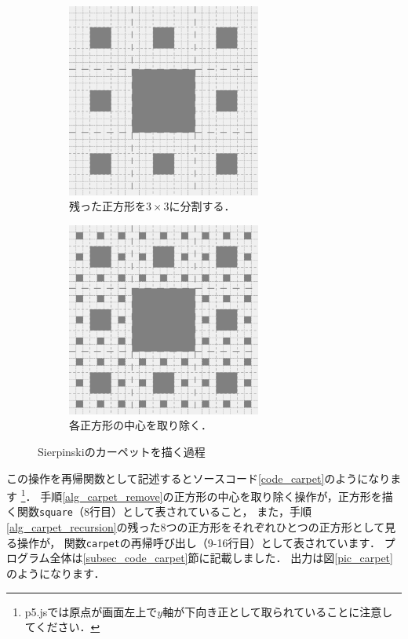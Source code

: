 \documentclass[dvipdfmx]{jsarticle}
\theoremstyle{definition}
\begin{document}
\begin{figure}[H]
\begin{subfigure}{0.325\textwidth}
        \includegraphics[width=0.7\textwidth]{figure/carpet/carpet_3_split.png}
        \caption{残った正方形を$3 \times 3$に分割する．}
    \end{subfigure}
    \begin{subfigure}{0.325\textwidth}
        \centering
        \includegraphics[width=0.7\textwidth]{figure/carpet/carpet_3_fill.png}
        \caption{各正方形の中心を取り除く．}
    \end{subfigure}
    \caption{Sierpinskiのカーペットを描く過程}
    \label{fig_process_carpet}
\end{figure}
%
この操作を再帰関数として記述するとソースコード\ref{code_carpet}のようになります
\footnote{
    p5.jsでは原点が画面左上で$y$軸が下向き正として取られていることに注意してください．
}．
手順\ref{alg_carpet_remove}の正方形の中心を取り除く操作が，正方形を描く関数\verb|square|（8行目）として表されていること，
また，手順\ref{alg_carpet_recursion}の残った8つの正方形をそれぞれひとつの正方形として見る操作が，
関数\verb|carpet|の再帰呼び出し（9-16行目）として表されています．
プログラム全体は\ref{subsec_code_carpet}節に記載しました．
出力は図\ref{pic_carpet}のようになります．
\clearpage
\end{document}
